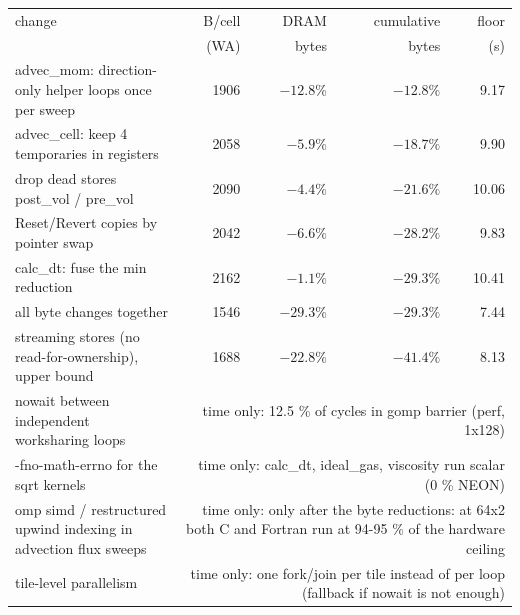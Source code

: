 \begin{tabular}{p{7.2cm}rrrr}
\toprule
change & B/cell & DRAM & cumulative & floor \\
 & (WA) & bytes & bytes & (s) \\
\midrule
advec\_mom: direction-only helper loops once per sweep & 1906 & $-12.8\%$ & $-12.8\%$ & 9.17 \\
advec\_cell: keep 4 temporaries in registers & 2058 & $-5.9\%$ & $-18.7\%$ & 9.90 \\
drop dead stores post\_vol / pre\_vol & 2090 & $-4.4\%$ & $-21.6\%$ & 10.06 \\
Reset/Revert copies by pointer swap & 2042 & $-6.6\%$ & $-28.2\%$ & 9.83 \\
calc\_dt: fuse the min reduction & 2162 & $-1.1\%$ & $-29.3\%$ & 10.41 \\
all byte changes together & 1546 & $-29.3\%$ & $-29.3\%$ & 7.44 \\
streaming stores (no read-for-ownership), upper bound & 1688 & $-22.8\%$ & $-41.4\%$ & 8.13 \\
nowait between independent worksharing loops & \multicolumn{4}{p{5.6cm}}{time only: 12.5 \% of cycles in gomp barrier (perf, 1x128)} \\
-fno-math-errno for the sqrt kernels & \multicolumn{4}{p{5.6cm}}{time only: calc\_dt, ideal\_gas, viscosity run scalar (0 \% NEON)} \\
omp simd / restructured upwind indexing in advection flux sweeps & \multicolumn{4}{p{5.6cm}}{time only: only after the byte reductions: at 64x2 both C and Fortran run at 94-95 \% of the hardware ceiling} \\
tile-level parallelism & \multicolumn{4}{p{5.6cm}}{time only: one fork/join per tile instead of per loop (fallback if nowait is not enough)} \\
\bottomrule
\end{tabular}
